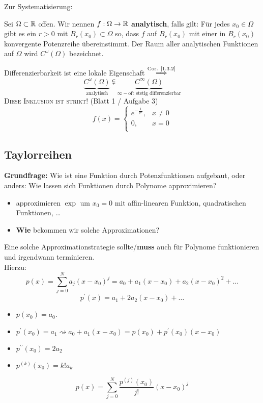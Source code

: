 Zur Systematisierung:
\begin{subdefinition}
	Sei $ \Omega \subset \mathbb{R}  $ offen.
	Wir nennen $ f: \Omega \to \mathbb{R}  $ \textbf{analytisch}, falls gilt: Für jedes $ x_0 \in \Omega $ gibt es ein $ r>0 $ mit $ B_{r}(x_0) \subset  \Omega $ so, dass $ f $ auf $ B_{r}(x_0)  $ mit einer in $ B_{r}(x_0)  $ konvergente Potenzreihe übereinstimmt.
	Der Raum aller analytischen Funktionen auf $ \Omega $ wird $ C^{\omega} (\Omega) $ bezeichnet.
\end{subdefinition}
Differenzierbarkeit ist eine lokale Eigenschaft $ \overset{\text{Cor. \ref{1.3.2}} }{\implies } $ 
\[
	\underbrace{C^\omega(\Omega)}_{\text{analytisch} } \subsetneqq \underbrace{C^\infty(\Omega)}_{\infty-\text{oft stetig differenzierbar} }
\]
\textsc{Diese Inklusion ist strikt!} (Blatt 1 / Aufgabe 3)
\[
	f(x) = \begin{cases}
		e^{-\frac{ 1 }{ x^2 }} , & x \neq 0 \\
		0, & x = 0 \\
	\end{cases}
\]


\subsection{Taylorreihen}
\textbf{Grundfrage:} Wie ist eine Funktion durch Potenzfunktionen aufgebaut, oder anders: Wie lassen sich Funktionen durch Polynome approximieren?
\begin{itemize}
	\item approximieren $ \exp  $ um $ x_0 = 0 $ mit affin-linearen Funktion, quadratischen Funktionen, \ldots
	\item \textbf{Wie} bekommen wir solche Approximationen?
\end{itemize}

Eine solche Approximationstrategie sollte/\textbf{muss} auch für Polynome funktionieren und irgendwann terminieren.\\
Hierzu: 
\[
	p(x) = \sum_{j=0}^{N} a_j (x - x_0)^j = a_0 + a_1(x - x_0) + a_2(x-x_0)^2 + \dotsc
\]
\[
	p^\prime(x) = a_1 + 2 a_2(x-x_0) + \dotsc
\]

\begin{itemize}
	\item $ p(x_0) = a_0 $.
	\item $ p^\prime(x_0) = a_1 \rightsquigarrow a_0 + a_1(x-x_0) = p(x_0) + p^\prime(x_0)(x-x_0)  $
	\item $ p^{\prime\prime} (x_0) = 2a_2 $ 
	\item $ p^{(k)} (x_0) = k! a_k $
\end{itemize}
\[
	p(x) = \sum_{j=0}^{N} \frac{ p^{(j)} (x_0) }{ j! }  (x - x_0)^j
\]

